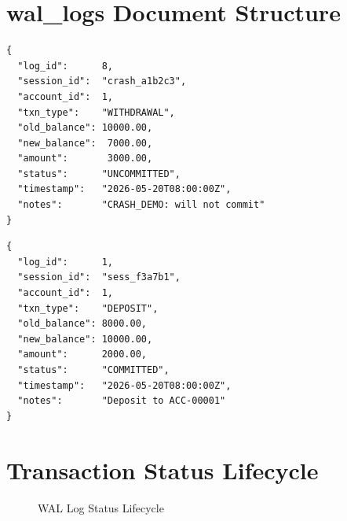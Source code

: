 \section{wal\_logs Document Structure}

\begin{lstlisting}[style=jsonstyle, caption={WAL Log Document --- UNCOMMITTED state (after crash)}]
{
  "log_id":      8,
  "session_id":  "crash_a1b2c3",
  "account_id":  1,
  "txn_type":    "WITHDRAWAL",
  "old_balance": 10000.00,
  "new_balance":  7000.00,
  "amount":       3000.00,
  "status":      "UNCOMMITTED",
  "timestamp":   "2026-05-20T08:00:00Z",
  "notes":       "CRASH_DEMO: will not commit"
}
\end{lstlisting}

\begin{lstlisting}[style=jsonstyle, caption={WAL Log Document --- COMMITTED state (normal flow)}]
{
  "log_id":      1,
  "session_id":  "sess_f3a7b1",
  "account_id":  1,
  "txn_type":    "DEPOSIT",
  "old_balance": 8000.00,
  "new_balance": 10000.00,
  "amount":      2000.00,
  "status":      "COMMITTED",
  "timestamp":   "2026-05-20T08:00:00Z",
  "notes":       "Deposit to ACC-00001"
}
\end{lstlisting}

\section{Transaction Status Lifecycle}

\begin{figure}[H]
\centering
{}
\caption{WAL Log Status Lifecycle}
\label{fig:status}
\end{figure}

